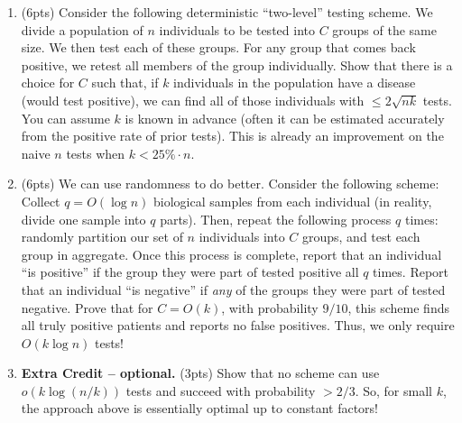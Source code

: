 \documentclass[10pt]{article}
\begin{document}
\begin{enumerate}
	\item (6pts) Consider the following deterministic ``two-level'' testing scheme. We divide a population of $n$ individuals to be tested into $C$ groups of the same size. We then test each of these groups. For any group that comes back positive, we retest all members of the group individually. Show that there is a choice for $C$ such that, if $k$ individuals in the population have a disease (would test positive), we can find all of those individuals with $\leq 2\sqrt{nk}$ tests. You can assume $k$ is known in advance (often it can be estimated accurately from the positive rate of prior tests). This is already an improvement on the naive $n$ tests when $k < 25\% \cdot n$.
	
	\item (6pts) We can use randomness to do better. Consider the following scheme: Collect $q = O(\log n)$ biological samples from each individual (in reality, divide one sample into $q$ parts). Then, repeat the following process $q$ times: randomly partition our set of $n$ individuals into $C$ groups, and test each group in aggregate. Once this process is complete, report that an individual ``is positive'' if the group they were part of tested positive all $q$ times. Report that an individual ``is negative'' if \emph{any} of the groups they were part of tested negative. Prove that for $C = O(k)$, with probability $9/10$, this scheme finds all truly positive patients and reports no false positives. Thus, we only require $O(k\log n)$ tests! 
	
	
	\item \textbf{Extra Credit -- optional.} (3pts) Show that no scheme can use $o(k\log(n/k))$ tests and succeed with probability $> 2/3$. So, for small $k$, the approach above is essentially optimal up to constant factors!
\end{enumerate}
\end{document}
